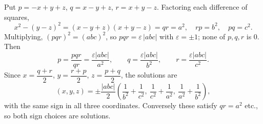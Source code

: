 Put $p=-x+y+z$, $q=x-y+z$, $r=x+y-z$. Factoring each difference of squares,
\[
x^2-(y-z)^2=(x-y+z)(x+y-z)=qr=a^2,\quad rp=b^2,\quad pq=c^2 .
\]
Multiplying, $(pqr)^2=(abc)^2$, so $pqr=\varepsilon\,|abc|$ with $\varepsilon=\pm1$; none of $p,q,r$ is $0$. Then
\[
p=\dfrac{pqr}{qr}=\dfrac{\varepsilon|abc|}{a^2},\qquad q=\dfrac{\varepsilon|abc|}{b^2},\qquad r=\dfrac{\varepsilon|abc|}{c^2}.
\]
Since $x=\dfrac{q+r}{2}$, $y=\dfrac{r+p}{2}$, $z=\dfrac{p+q}{2}$, the solutions are
\[
\boxed{(x,y,z)=\pm\dfrac{|abc|}{2}\left(\dfrac{1}{b^2}+\dfrac{1}{c^2},\ \dfrac{1}{c^2}+\dfrac{1}{a^2},\ \dfrac{1}{a^2}+\dfrac{1}{b^2}\right)},
\]
with the same sign in all three coordinates. Conversely these satisfy $qr=a^2$ etc., so both sign choices are solutions.
